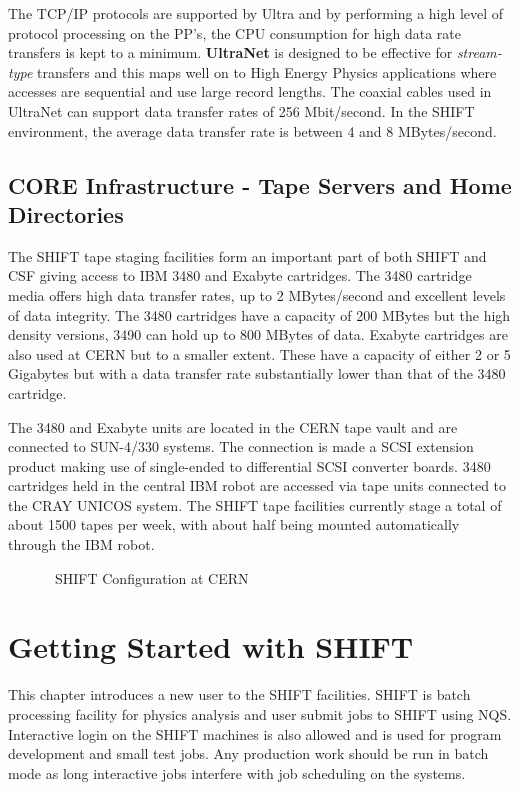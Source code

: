 The TCP/IP protocols are supported by Ultra and by performing a high
level of protocol processing on the PP's, the CPU consumption
for high data rate transfers is kept to a minimum.
{\bf UltraNet}
is designed to be effective for
{\em stream-type}
transfers and this maps well on to High Energy Physics
applications where accesses are sequential and use large record lengths.
The coaxial cables used in UltraNet can support data transfer rates of
256 Mbit/second.
In the SHIFT environment, the average data transfer rate is
between 4 and 8 MBytes/second.
 
\section {CORE Infrastructure - Tape Servers and Home Directories}
 
The SHIFT tape staging facilities form an important part of both
SHIFT and CSF giving access to IBM 3480 and Exabyte cartridges.
The 3480 cartridge media offers high data transfer rates, up to 2 MBytes/second
and excellent levels of data integrity.
The 3480 cartridges have a capacity of 200 MBytes but the high density
versions, 3490 can hold up to 800 MBytes of data.
Exabyte cartridges are also used at CERN but to a smaller extent.
These have a capacity of either 2 or 5 Gigabytes but with a data transfer rate
substantially lower than that of the 3480 cartridge.
 
The 3480 and Exabyte units are located in the
CERN tape vault and are connected to SUN-4/330 systems. The connection
is made a SCSI extension product making use of single-ended to
differential SCSI converter boards.
3480 cartridges held in the central IBM robot are accessed
via tape units connected to the CRAY UNICOS system.
The SHIFT tape facilities currently stage a total of about 1500 tapes per week,
with about half being mounted automatically through the IBM robot.
 
 
\begin{figure}
\centerline\mbox{}
\caption{~\label{fig_gen_arch}SHIFT Configuration at CERN}
\end{figure}
 
 
\chapter{Getting Started with SHIFT}
 
This chapter introduces a new user to the SHIFT facilities.
SHIFT is batch processing facility for physics analysis
and user submit jobs to SHIFT using NQS.
Interactive login on the SHIFT machines is also allowed
and is used for program development and small test jobs.
Any production work should be run in batch mode as long
interactive jobs interfere with job scheduling on the systems.
 
